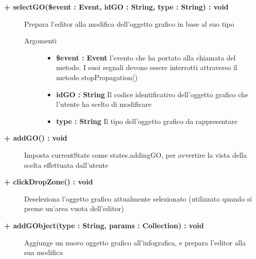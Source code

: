 \begin{description}
\begin{description}
\begin{description}
		\end{description}
	\end{description}
	
	\begin{description}
		\item[\textbf{\color{blue}+ selectGO(\$event : Event, idGO : String, type : String) : void 	}] \hfill
			Prepara l'editor alla modifica dell'oggetto grafico in base al suo tipo
			
		\begin{description}
			\item[Argomenti] \hfill
				\begin{itemize}
				
					\item \textbf{\$event : Event	} \hfill
					l'evento che ha portato alla chiamata del metodo. I suoi segnali devono essere interrotti attraverso il metodo stopPropagation()		
					\item \textbf{idGO : String	} \hfill
					Il codice identificativo dell'oggetto grafico che l'utente ha scelto di modificare
					\item \textbf{type : String	} \hfill
					Il tipo dell'oggetto grafico da rappresentare
				\end{itemize}
				
		\end{description}
	\end{description}
	
	\begin{description}
		\item[\textbf{\color{blue}+ addGO() : void	}] \hfill
			Imposta currentState come states.addingGO, per avvertire la vista della scelta effettuata dall'utente
		
	\end{description}
	
	\begin{description}
		\item[\textbf{\color{blue}+ clickDropZone() : void	}] \hfill
			Deseleziona l'oggetto grafico attualmente selezionato (utilizzato quando si preme un'area vuota dell'editor)
		
	\end{description}
	
	\begin{description}
		\item[\textbf{\color{blue}+ addGObject(type : String, params : Collection) : void 	}] \hfill
			Aggiunge un nuovo oggetto grafico all'infografica, e prepara l'editor alla sua modifica
			

\end{description}
\end{description}
